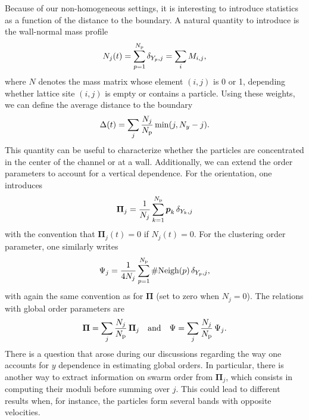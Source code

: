 \documentclass[aps,prl,twocolumn,amsmath,amssymb,superscriptaddress]{revtex4-1}
\begin{document}
Because of our non-homogeneous settings, it is interesting to introduce statistics as a function of the distance to the boundary. A natural quantity to introduce is the wall-normal mass profile
\begin{equation}
N_j(t) = \sum_{p = 1}^{N_{\rm p}} \delta_{Y_{p},j} = \sum_i M_{i,j},
\end{equation}
where $N$ denotes the mass matrix whose element $(i,j)$ is 0 or 1, depending whether lattice site $(i,j)$ is empty or contains a particle. Using these weights, we can define the average distance to the boundary
\begin{equation}
  \Delta(t) = \sum_j \frac{N_j}{N_{\rm p}} \min(j,N_y-j).
\end{equation}
This quantity can be useful to characterize whether the particles are concentrated in the center of the channel or at a wall.  Additionally, we can extend the order parameters to account for a vertical dependence. For the orientation, one introduces
\begin{equation}
  \boldsymbol{\Pi}_j = \frac{1}{N_j} \sum_{k=1}^{N_{\rm p}} \boldsymbol{p}_{k}\,\delta_{Y_{k},j}
\end{equation}
with the convention that $\boldsymbol{\Pi}_j(t) = 0$ if $N_j(t)=0$. For the clustering order parameter, one similarly writes
\begin{equation}
  \Psi_j =  \frac{1}{4N_j}\sum_{p=1}^{N_{\rm p}} \# {\rm Neigh}(p)\,\delta_{Y_{p},j},
\end{equation}
with again the same convention as for $\boldsymbol{\Pi}$ (set to zero when $N_j=0$). The relations with global order parameters are
\begin{equation}
  \boldsymbol{\Pi} = \sum_j \frac{N_j}{N_{\rm p}}\,\boldsymbol{\Pi}_j \quad\text{and}\quad \Psi = \sum_j \frac{N_j}{N_{\rm p}}\,\Psi_j.
\end{equation}
There is a question that arose during our discussions regarding the way one accounts for $y$ dependence in estimating global orders. In particular, there is another way to extract information on swarm order from $\boldsymbol{\Pi}_j$, which consists in computing their moduli before summing over $j$. This could lead to different results when, for instance, the particles form several bands with opposite velocities.
\end{document}
